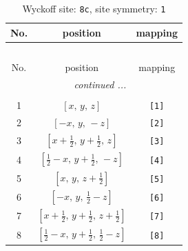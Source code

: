 \documentclass[fleqn,8pt]{jsarticle}
\begin{document}
\renewcommand{\arraystretch}{1.2}
\begin{longtable}{ccc}
\caption{Wyckoff site: {\tt 8c}, site symmetry: {\tt 1}}
 \\
 \hline \hline
No. & position & mapping \\ \hline \endfirsthead

\multicolumn{2}{l}{\tablename\ \thetable{}} \\
 \hline \hline
No. & position & mapping \\ \hline \endhead

 \hline \hline
\multicolumn{2}{r}{\footnotesize\it continued ...} \\ \endfoot

 \hline \hline
\multicolumn{2}{r}{} \\ \endlastfoot

1 & $\left[ x,\, y,\, z \right]$ & {\tt [1]} \\ \hline
2 & $\left[ - x,\, y,\, - z \right]$ & {\tt [2]} \\ \hline
3 & $\left[ x + \frac{1}{2},\, y + \frac{1}{2},\, z \right]$ & {\tt [3]} \\ \hline
4 & $\left[ \frac{1}{2} - x,\, y + \frac{1}{2},\, - z \right]$ & {\tt [4]} \\ \hline
5 & $\left[ x,\, y,\, z + \frac{1}{2} \right]$ & {\tt [5]} \\ \hline
6 & $\left[ - x,\, y,\, \frac{1}{2} - z \right]$ & {\tt [6]} \\ \hline
7 & $\left[ x + \frac{1}{2},\, y + \frac{1}{2},\, z + \frac{1}{2} \right]$ & {\tt [7]} \\ \hline
8 & $\left[ \frac{1}{2} - x,\, y + \frac{1}{2},\, \frac{1}{2} - z \right]$ & {\tt [8]} \\
\end{longtable}
\end{document}
